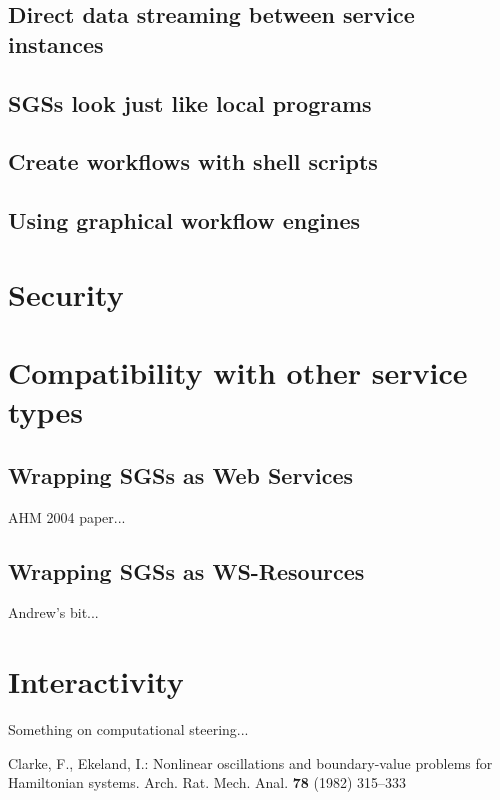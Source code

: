 \documentclass{llncs}
\begin{document}
\subsection{Direct data streaming between service instances}

\subsection{SGSs look just like local programs}

\subsection{Create workflows with shell scripts}
%
\subsection{Using graphical workflow engines}
%
\section{Security}
%
\section{Compatibility with other service types}
\subsection{Wrapping SGSs as Web Services}
AHM 2004 paper...
\subsection{Wrapping SGSs as WS-Resources}
Andrew's bit...
%
\section{Interactivity} \label{sec:interactivity}
Something on computational steering...
%
%
\begin{thebibliography}{refs}
%
%
Clarke, F., Ekeland, I.:
Nonlinear oscillations and
boundary-value problems for Hamiltonian systems.
Arch. Rat. Mech. Anal. {\bf 78} (1982) 315--333

\end{thebibliography}
\end{document}
